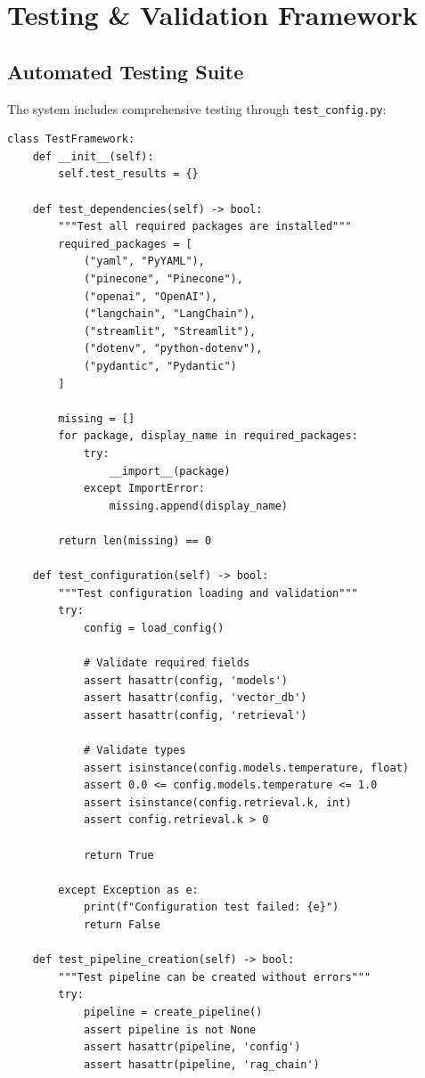 \documentclass[12pt,a4paper]{article}
\begin{document}
\section{Testing \& Validation Framework}

\subsection{Automated Testing Suite}

The system includes comprehensive testing through \texttt{test\_config.py}:

\begin{lstlisting}[caption=Testing Framework Structure]
class TestFramework:
    def __init__(self):
        self.test_results = {}
    
    def test_dependencies(self) -> bool:
        """Test all required packages are installed"""
        required_packages = [
            ("yaml", "PyYAML"),
            ("pinecone", "Pinecone"),
            ("openai", "OpenAI"),
            ("langchain", "LangChain"),
            ("streamlit", "Streamlit"),
            ("dotenv", "python-dotenv"),
            ("pydantic", "Pydantic")
        ]
        
        missing = []
        for package, display_name in required_packages:
            try:
                __import__(package)
            except ImportError:
                missing.append(display_name)
        
        return len(missing) == 0
    
    def test_configuration(self) -> bool:
        """Test configuration loading and validation"""
        try:
            config = load_config()
            
            # Validate required fields
            assert hasattr(config, 'models')
            assert hasattr(config, 'vector_db')
            assert hasattr(config, 'retrieval')
            
            # Validate types
            assert isinstance(config.models.temperature, float)
            assert 0.0 <= config.models.temperature <= 1.0
            assert isinstance(config.retrieval.k, int)
            assert config.retrieval.k > 0
            
            return True
            
        except Exception as e:
            print(f"Configuration test failed: {e}")
            return False
    
    def test_pipeline_creation(self) -> bool:
        """Test pipeline can be created without errors"""
        try:
            pipeline = create_pipeline()
            assert pipeline is not None
            assert hasattr(pipeline, 'config')
            assert hasattr(pipeline, 'rag_chain')
            

\end{lstlisting}
\end{document}
